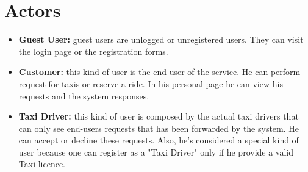 \documentclass{report}
\begin{document}
\section{Actors}
\begin{itemize}
  \item \textbf{Guest User:} guest users are unlogged or unregistered users. They can visit the login page or the registration forms.

  \item \textbf{Customer:} this kind of user is the end-user of the service. He can perform request for taxis or reserve a ride. In his personal page he can view his requests and the system responses.

  \item \textbf{Taxi Driver:} this kind of user is composed by the actual taxi drivers that can only see end-users requests that has been forwarded by the system. He can accept or decline these requests. Also, he's considered a special kind of user because one can register as a "Taxi Driver" only if he provide a valid Taxi licence.
\end{itemize}
\end{document}
